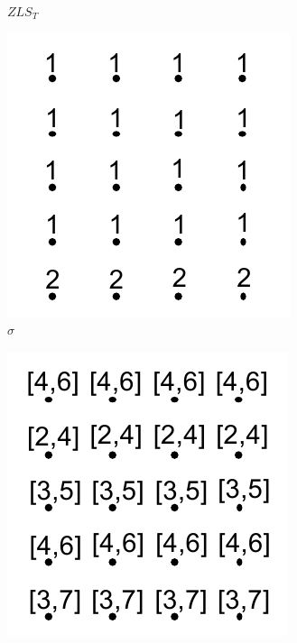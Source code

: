 \begin{figure}[!b]
\begin{subfigure}{0.243\linewidth}
\vspace{-5mm}
\caption{$ZLS_{T}$}
\label{fig:zlsT}
\end{subfigure}
\begin{subfigure}{0.243\linewidth}
\includegraphics[width=\linewidth]{Images/sigma.pdf}
\vspace{-5mm}
\caption{${\sigma}$}
\label{fig:sigma}
\end{subfigure}
\begin{subfigure}{0.243\linewidth}
\includegraphics[width=\linewidth]{Images/boundsC.pdf}

\end{subfigure}
\end{figure}
